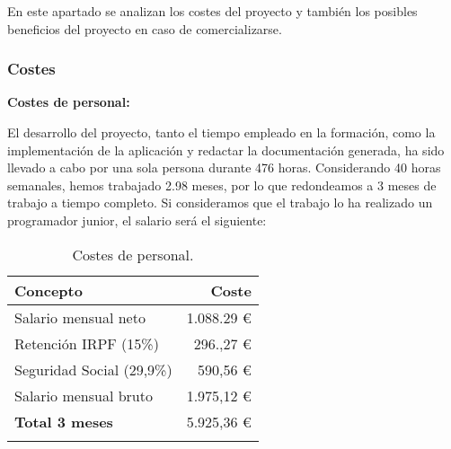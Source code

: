 En este apartado se analizan los costes del proyecto y también los posibles  beneficios del proyecto en caso de comercializarse.

\subsubsection{Costes}
\textbf{Costes de personal:}

El desarrollo del proyecto, tanto el tiempo empleado en la formación, como la implementación de la aplicación y redactar la documentación
generada, ha sido llevado a cabo por una sola persona durante 476 horas. Considerando 40 horas semanales, hemos trabajado 2.98  meses, por lo que redondeamos a 3 meses de trabajo a tiempo completo. Si consideramos que el trabajo lo ha realizado un programador junior, el salario será el siguiente:

\begin{longtable}[]{@{}lr@{}}
\toprule
\begin{minipage}[b]{0.38\columnwidth}\raggedright\strut
\textbf{Concepto}\strut
\end{minipage} & \begin{minipage}[b]{0.20\columnwidth}\raggedright\strut
\textbf{Coste}\strut
\end{minipage}\tabularnewline
\midrule
\endhead
\begin{minipage}[t]{0.38\columnwidth}\raggedright\strut
Salario mensual neto\strut
\end{minipage} & \begin{minipage}[t]{0.20\columnwidth}\raggedright\strut
1.088.29 \euro{}\strut
\end{minipage}\tabularnewline
\begin{minipage}[t]{0.38\columnwidth}\raggedright\strut
Retención IRPF (15\%)\strut
\end{minipage} & \begin{minipage}[t]{0.20\columnwidth}\raggedright\strut
296.,27 \euro{}\strut
\end{minipage}\tabularnewline
\begin{minipage}[t]{0.38\columnwidth}\raggedright\strut
Seguridad Social (29,9\%)\strut
\end{minipage} & \begin{minipage}[t]{0.20\columnwidth}\raggedright\strut
590,56 \euro{}\strut
\end{minipage}\tabularnewline
\begin{minipage}[t]{0.38\columnwidth}\raggedright\strut
Salario mensual bruto\strut
\end{minipage} & \begin{minipage}[t]{0.20\columnwidth}\raggedright\strut
1.975,12 \euro{}\strut
\end{minipage}\tabularnewline
\midrule
\begin{minipage}[t]{0.38\columnwidth}\raggedright\strut
\textbf{Total 3 meses}\strut
\end{minipage} & \begin{minipage}[t]{0.20\columnwidth}\raggedright\strut
5.925,36 \euro{}\strut
\end{minipage}\tabularnewline
\bottomrule
\caption{Costes de personal.}
\end{longtable}

